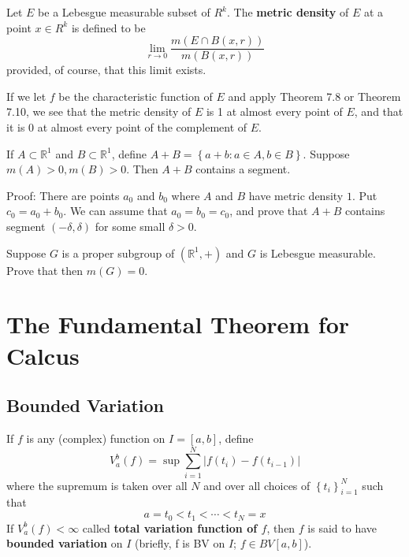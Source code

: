 \documentclass[12pt, a4paper, oneside]{book}
\begin{document}
\begin{theorem}
    Let $E$ be a Lebesgue measurable subset of $R^k$. The \textbf{metric density} of $E$ at a point $x \in R^k$ is defined to be
    \begin{equation*}
        \lim _{r \rightarrow 0} \frac{m(E \cap B(x, r))}{m(B(x, r))}
    \end{equation*}
    provided, of course, that this limit exists.

    If we let $f$ be the characteristic function of $E$ and apply Theorem 7.8 or Theorem 7.10, we see that the metric density of $E$ is 1 at almost every point of $E$, and that it is 0 at almost every point of the complement of $E$.
\end{theorem}

\begin{proposition}
    If $A \subset \mathbb{R}^1$ and $B \subset \mathbb{R}^1$, define $A+B=\left\{a+b: a \in A, b \in B\right\}$. Suppose $m(A)>0, m(B)>0$. Then $A+B$ contains a segment.

    Proof:
    There are points $a_0$ and $b_0$ where $A$ and $B$ have metric density $1$. Put $c_0=a_0+b_0$. We can assume that $a_0=b_0=c_0$, and prove that $A+B$ contains segment $\left(-\delta, \delta\right)$ for some small $\delta>0$.
\end{proposition}

\begin{question}
    Suppose $G$ is a proper subgroup of $\left(\mathbb{R}^1,+\right)$ and $G$ is Lebesgue measurable. Prove that then $m(G)=0$.
\end{question}


\section{The Fundamental Theorem for Calcus}




\subsection{Bounded Variation}
\begin{definition}
    If $f$ is any (complex) function on $I=[a,b]$, define
    \begin{equation*}
        V_a^b \left(f\right)
        =
        \sup \sum_{i=1}^N\left|f\left(t_i\right)-f\left(t_{i-1}\right)\right|
    \end{equation*}
    where the supremum is taken over all $N$ and over all choices of $\left\{t_i\right\}_{i=1}^N$ such that
    \begin{equation*}
        a
        =
        t_0<t_1<\cdots<t_N
        =
        x
    \end{equation*}
    If $V_a^b \left(f\right) < \infty$ called \textbf{total variation function of $f$}, then $f$ is said to have \textbf{bounded variation} on $I$ (briefly, f is BV on $I$; $f \in BV[a,b]$).
\end{definition}
\end{document}
